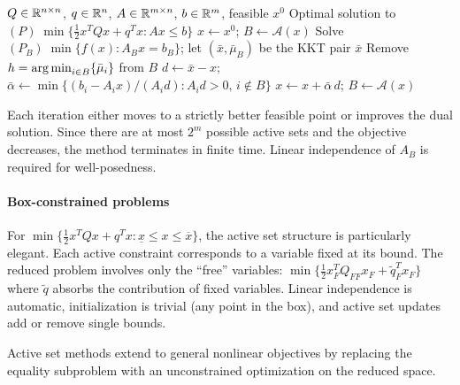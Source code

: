 \begin{algorithm}
	\caption{Active Set Method for Quadratic Programs (ASMQP)}
	\label{alg:ASMQP}
	\begin{algorithmic}[1]
		\Require $Q \in \mathbb{R}^{n \times n}$, $q \in \mathbb{R}^n$, $A \in \mathbb{R}^{m \times n}$, $b \in \mathbb{R}^m$, feasible $x^0$
		\Ensure Optimal solution to $(P)\; \min\{\frac{1}{2} x^T Q x + q^T x : Ax \leq b\}$
			\State $x \gets x^0$;\; $B \gets \mathcal{A}(x)$
				\State Solve $(P_B)\; \min\{f(x) : A_B x = b_B\}$; let $(\bar{x}, \bar{\mu}_B)$ be the KKT pair
				 
					 \Return $\bar{x}$ 
					\Else
						\State Remove $h = \operatorname*{arg\,min}_{i \in B}\{\bar{\mu}_i\}$ from $B$ 
					\EndIf
				\Else
					\State $d \gets \bar{x} - x$;\;
						$\bar{\alpha} \gets \min\{(b_i - A_i x)/(A_i d) : A_i d > 0,\, i \notin B\}$
					\State $x \gets x + \bar{\alpha}\, d$;\; $B \gets \mathcal{A}(x)$
				\EndIf
			\EndWhile
		\EndProcedure
	\end{algorithmic}
\end{algorithm}

Each iteration either moves to a strictly better feasible point or improves the dual solution.
Since there are at most $2^m$ possible active sets and the objective decreases, the method terminates in finite time.
Linear independence of $A_B$ is required for well-posedness.

\paragraph{Box-constrained problems}

For $\min\{\frac{1}{2} x^T Q x + q^T x : \underline{x} \leq x \leq \overline{x}\}$, the active set structure is particularly elegant.
Each active constraint corresponds to a variable fixed at its bound.
The reduced problem involves only the ``free'' variables: $\min\{\frac{1}{2} x_F^T Q_{FF} x_F + \tilde{q}_F^T x_F\}$ where $\tilde{q}$ absorbs the contribution of fixed variables.
Linear independence is automatic, initialization is trivial (any point in the box), and active set updates add or remove single bounds.

Active set methods extend to general nonlinear objectives by replacing the equality subproblem with an unconstrained optimization on the reduced space.


